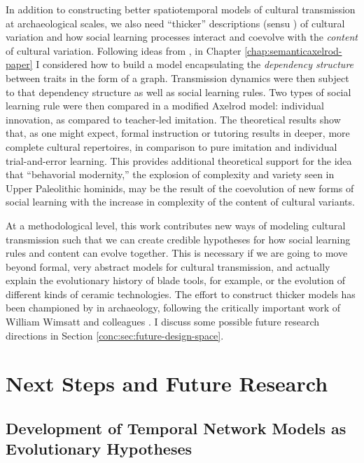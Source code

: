 In addition to constructing better spatiotemporal models of cultural transmission at archaeological scales, we also need ``thicker'' descriptions (sensu \citealt{Geertz1973,gilbert1949concept}) of cultural variation and how social learning processes interact and coevolve with the \emph{content} of cultural variation.  Following ideas from \citet{mesoudi2008learning}, in Chapter \ref{chap:semanticaxelrod-paper} I considered how to build a model encapsulating the \emph{dependency structure} between traits in the form of a graph.  Transmission dynamics were then subject to that dependency structure as well as social learning rules.  Two types of social learning rule were then compared in a modified Axelrod model:  individual innovation, as compared to teacher-led imitation.  The theoretical results show that, as one might expect, formal instruction or tutoring results in deeper, more complete cultural repertoires, in comparison to pure imitation and individual trial-and-error learning.  This provides additional theoretical support for the idea that ``behavorial modernity,'' the explosion of complexity and variety seen in Upper Paleolithic hominids, may be the result of the coevolution of new forms of social learning with the increase in complexity of the content of cultural variants.  

At a methodological level, this work contributes new ways of modeling cultural transmission such that we can create credible hypotheses for how social learning rules and content can evolve together.  This is necessary if we are going to move beyond formal, very abstract models for cultural transmission, and actually explain the evolutionary history of blade tools, for example, or the evolution of different kinds of ceramic technologies.  The effort to construct thicker models has been championed by \citet{tostevin2019content} in archaeology, following the critically important work of William Wimsatt and colleagues \citep{wimsatt2007reproducing,wimsatt2019articulating}.  I discuss some possible future research directions in Section \ref{conc:sec:future-design-space}.

\section{Next Steps and Future Research}\label{conc:sec:future-research}


\subsection{Development of Temporal Network Models as Evolutionary Hypotheses}\label{conc:sec:future-temporal-networks}


